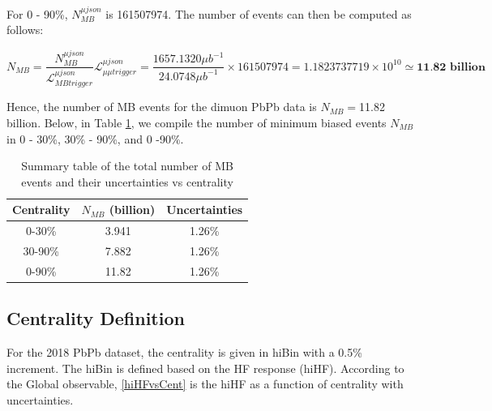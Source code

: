 \fi

For 0 - 90\%, $N_{MB}^{\mu json}$ is 161507974. The number of events can then be computed as follows:

\begin{equation}
N_{MB} = \frac{N^{\mu json}_{MB}}{\mathcal{L}_{MB trigger}^{\mu json}} \mathcal{L}_{\mu\mu trigger}^{\mu json} = \frac{1657.1320 \mu b^{-1}}{24.0748  \mu b^{-1}} \times 161507974 =  1.1823737719 \times 10^{10} \simeq  \textbf{11.82 billion}
\end{equation}

Hence, the number of MB events for the dimuon PbPb data is $N_{MB} = $11.82 billion. Below, in Table \ref{NMBUsedCent}, we compile the number of minimum biased events $N_{MB}$ in 0 - 30\%, 30\% - 90\%, and 0 -90\%. 

\begin{table}[h]
\begin{center}
\caption{Summary table of the total number of MB events and their uncertainties vs centrality}
\vspace{1em}
\label{NMBUsedCent}
  \begin{tabular}{ |c | c| c| }
    \hline 
Centrality & $N_{MB}$ (billion) & Uncertainties  \\
     \hline
         \hline
0-30\% &  3.941 & 1.26\% \\
30-90\% & 7.882 & 1.26\% \\
0-90\% & 11.82 & 1.26\% \\
     \hline
    \hline
\end{tabular}
\end{center}
\end{table}


\subsection{Centrality Definition}

For the 2018 PbPb dataset, the centrality is given in hiBin with a 0.5\% increment. The hiBin is defined based on the HF response (hiHF). According to the Global observable, \ref{hiHFvsCent} is the hiHF as a function of centrality with uncertainties.


